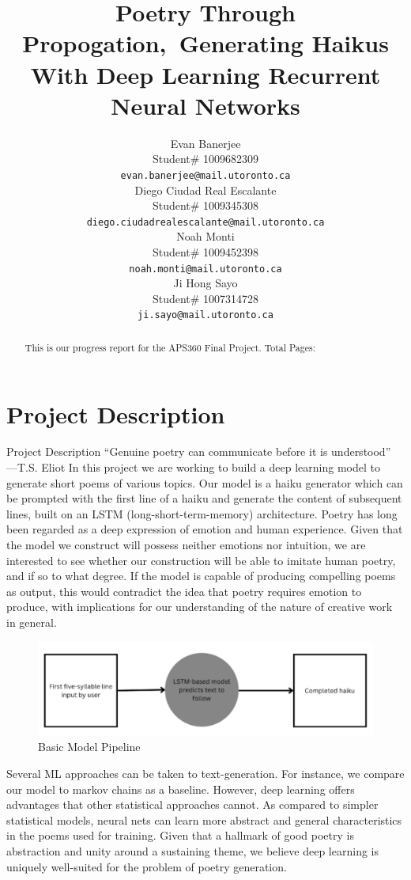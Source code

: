 \documentclass{article} %
\title{Poetry Through Propogation,\ Generating Haikus With Deep Learning Recurrent Neural Networks}
\author{Evan Banerjee  \\
Student\# 1009682309\\
\texttt{evan.banerjee@mail.utoronto.ca} \\
\And
Diego Ciudad Real Escalante  \\
Student\# 1009345308 \\
\texttt{diego.ciudadrealescalante@mail.utoronto.ca} \\
\AND
Noah Monti  \\
Student\# 1009452398 \\
\texttt{noah.monti@mail.utoronto.ca} \\
\And
Ji Hong Sayo \\
Student\# 1007314728 \\
\texttt{ji.sayo@mail.utoronto.ca} \\
\AND
}
\begin{document}
\maketitle

\begin{abstract}
This is our progress report for the APS360 Final Project.
Total Pages: \pageref{last_page}
\end{abstract}



\section{Project Description}

Project Description
“Genuine poetry can communicate before it is understood” —T.S. Eliot
In this project we are working to build a deep learning model to generate short poems of various topics. 
Our model is a haiku generator which can be prompted with the first line of a haiku and generate the content of subsequent lines, built on an LSTM (long-short-term-memory) architecture.
Poetry has long been regarded as a deep expression of emotion and human experience. Given that the model we construct will possess neither emotions nor intuition, we are interested to see whether our construction will be able to imitate human poetry, and if so to what degree. If the model is capable of producing compelling poems as output, this would contradict the idea that poetry requires emotion to produce, with implications for our understanding of the nature of creative work in general.

\begin{figure}[h]
  \begin{center}
  \includegraphics[width=1\textwidth]{Figs/pipeline.png}
  \end{center}
  \caption{Basic Model Pipeline}
  \label{fig:pipeline}
\end{figure}

Several ML approaches can be taken to text-generation. 
For instance, we compare our model to markov chains as a baseline. 
However, deep learning offers advantages that other statistical approaches cannot. 
As compared to simpler statistical models, neural nets can learn more abstract and general characteristics in the poems used for training. 
Given that a hallmark of good poetry is abstraction and unity around a sustaining theme, 
we believe deep learning is uniquely well-suited for the problem of poetry generation.
\end{document}
